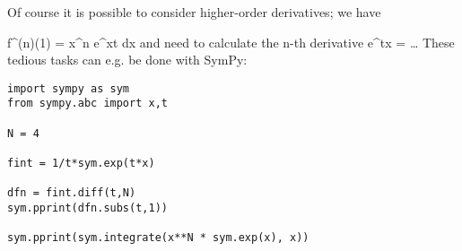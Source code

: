 Of course it is possible to consider higher-order derivatives; we have

\bee
f^{(n)}(1) = \int x^n e^{xt} dx
\eee
%
and need to calculate the n-th derivative
%
\bee
{}  e^{tx} = \ldots
\eee
%
These tedious tasks can e.g. be done with SymPy:

\begin{verbatim}
import sympy as sym
from sympy.abc import x,t

N = 4

fint = 1/t*sym.exp(t*x)

dfn = fint.diff(t,N)
sym.pprint(dfn.subs(t,1))

sym.pprint(sym.integrate(x**N * sym.exp(x), x))

\end{verbatim}
